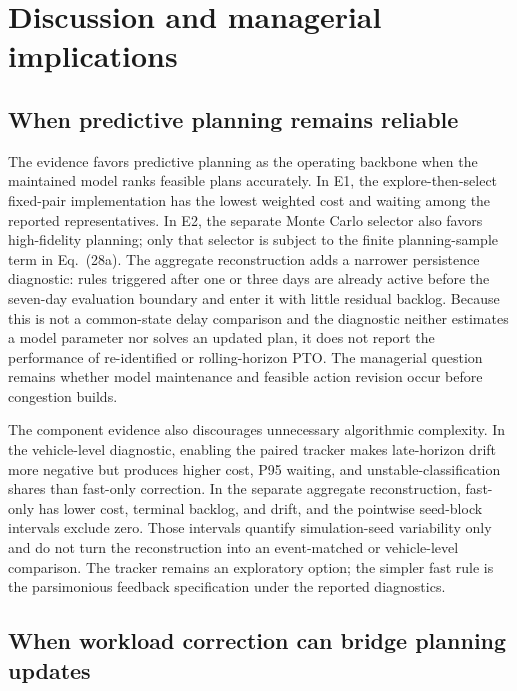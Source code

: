 \documentclass[preprint,12pt,authoryear,a4paper]{elsarticle}
\begin{document}
\section{Discussion and managerial implications}
\label{sec:policy-implications}

\subsection{When predictive planning remains reliable}

The evidence favors predictive planning as the operating backbone when the maintained model ranks feasible plans accurately. In E1, the explore-then-select fixed-pair implementation has the lowest weighted cost and waiting among the reported representatives. In E2, the separate Monte Carlo selector also favors high-fidelity planning; only that selector is subject to the finite planning-sample term in Eq.~(28a). The aggregate reconstruction adds a narrower persistence diagnostic: rules triggered after one or three days are already active before the seven-day evaluation boundary and enter it with little residual backlog. Because this is not a common-state delay comparison and the diagnostic neither estimates a model parameter nor solves an updated plan, it does not report the performance of re-identified or rolling-horizon PTO. The managerial question remains whether model maintenance and feasible action revision occur before congestion builds.

The component evidence also discourages unnecessary algorithmic complexity. In the vehicle-level diagnostic, enabling the paired tracker makes late-horizon drift more negative but produces higher cost, P95 waiting, and unstable-classification shares than fast-only correction. In the separate aggregate reconstruction, fast-only has lower cost, terminal backlog, and drift, and the pointwise seed-block intervals exclude zero. Those intervals quantify simulation-seed variability only and do not turn the reconstruction into an event-matched or vehicle-level comparison. The tracker remains an exploratory option; the simpler fast rule is the parsimonious feedback specification under the reported diagnostics.

\subsection{When workload correction can bridge planning updates}
\end{document}
